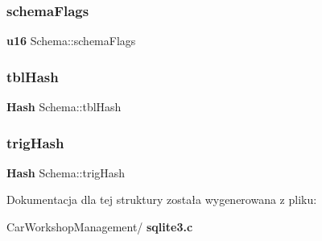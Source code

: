 \subsubsection{schemaFlags}
{\footnotesize\ttfamily \textbf{ u16} Schema\+::schema\+Flags}

\mbox{\label{struct_schema_af841eadc93b289944b95f72b784bfaae}} 
\subsubsection{tblHash}
{\footnotesize\ttfamily \textbf{ Hash} Schema\+::tbl\+Hash}

\mbox{\label{struct_schema_ab521f4545d200329d8e1a46bbb67e7c5}} 
\subsubsection{trigHash}
{\footnotesize\ttfamily \textbf{ Hash} Schema\+::trig\+Hash}



Dokumentacja dla tej struktury została wygenerowana z pliku\+:\begin{DoxyCompactItemize}
\item 
Car\+Workshop\+Management/\textbf{ sqlite3.\+c}\end{DoxyCompactItemize}
